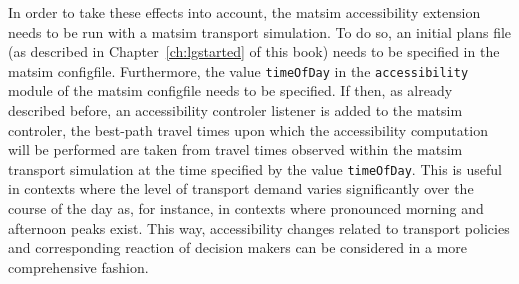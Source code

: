 
In order to take these effects into account, the \gls{matsim} accessibility extension needs to be run with a \gls{matsim} 
transport simulation. To do so, an initial plans file (as described in Chapter~\ref{ch:lgstarted} of this book) 
needs to be specified in the \gls{matsim} \gls{configfile}. Furthermore, the value \lstinline{timeOfDay} in
the \lstinline{accessibility} module of the \gls{matsim} \gls{configfile} needs to be specified. If then, as already
described before, an accessibility controler listener is added to the \gls{matsim} controler, the best-path travel
times upon which the accessibility computation will be performed are taken from travel times observed within
the \gls{matsim} transport simulation at the time specified by the value \lstinline{timeOfDay}. This is useful in
contexts where the level of transport demand varies significantly over the course of the day as, for instance, 
in contexts where pronounced morning and afternoon peaks exist. This way, accessibility changes related to transport
policies and corresponding reaction of decision makers can be considered in a more comprehensive fashion.


